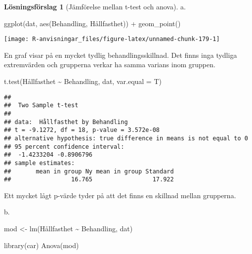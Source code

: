 \documentclass[
]{book}
\newenvironment{Shaded}{\begin{snugshade}}{\end{snugshade}}
\newcommand{\AttributeTok}[1]{\textcolor[rgb]{0.77,0.63,0.00}{#1}}
\newcommand{\FunctionTok}[1]{\textcolor[rgb]{0.00,0.00,0.00}{#1}}
\newcommand{\NormalTok}[1]{#1}
\newcommand{\OtherTok}[1]{\textcolor[rgb]{0.56,0.35,0.01}{#1}}
\newcommand{\SpecialCharTok}[1]{\textcolor[rgb]{0.00,0.00,0.00}{#1}}
\theoremstyle{definition}
\theoremstyle{definition}
\theoremstyle{definition}
\theoremstyle{definition}
\newtheorem{hypothesis}{Lösningsförslag}[chapter]
\theoremstyle{remark}
\begin{document}
\begin{hypothesis}[Jämförelse mellan t-test och anova]
a.

\begin{Shaded}
\begin{Highlighting}[]
\FunctionTok{ggplot}\NormalTok{(dat, }\FunctionTok{aes}\NormalTok{(Behandling, Hållfasthet)) }\SpecialCharTok{+}
  \FunctionTok{geom\_point}\NormalTok{()}
\end{Highlighting}
\end{Shaded}

\begin{center}\texttt{[image: R-anvisningar\_files/figure-latex/unnamed-chunk-179-1]} \end{center}

En graf visar på en mycket tydlig behandlingsskillnad. Det finns inga tydliga extremvärden och grupperna verkar ha samma varians inom gruppen.

\begin{Shaded}
\begin{Highlighting}[]
\FunctionTok{t.test}\NormalTok{(Hållfasthet }\SpecialCharTok{\textasciitilde{}}\NormalTok{ Behandling, dat, }\AttributeTok{var.equal =}\NormalTok{ T)}
\end{Highlighting}
\end{Shaded}

\begin{verbatim}
## 
##  Two Sample t-test
## 
## data:  Hållfasthet by Behandling
## t = -9.1272, df = 18, p-value = 3.572e-08
## alternative hypothesis: true difference in means is not equal to 0
## 95 percent confidence interval:
##  -1.4233204 -0.8906796
## sample estimates:
##       mean in group Ny mean in group Standard 
##                 16.765                 17.922
\end{verbatim}

Ett mycket lågt p-värde tyder på att det finns en skillnad mellan grupperna.

b.

\begin{Shaded}
\begin{Highlighting}[]
\NormalTok{mod }\OtherTok{\textless{}{-}} \FunctionTok{lm}\NormalTok{(Hållfasthet }\SpecialCharTok{\textasciitilde{}}\NormalTok{ Behandling, dat)}

\FunctionTok{library}\NormalTok{(car)}
\FunctionTok{Anova}\NormalTok{(mod)}
\end{Highlighting}
\end{Shaded}


\end{hypothesis}
\end{document}
